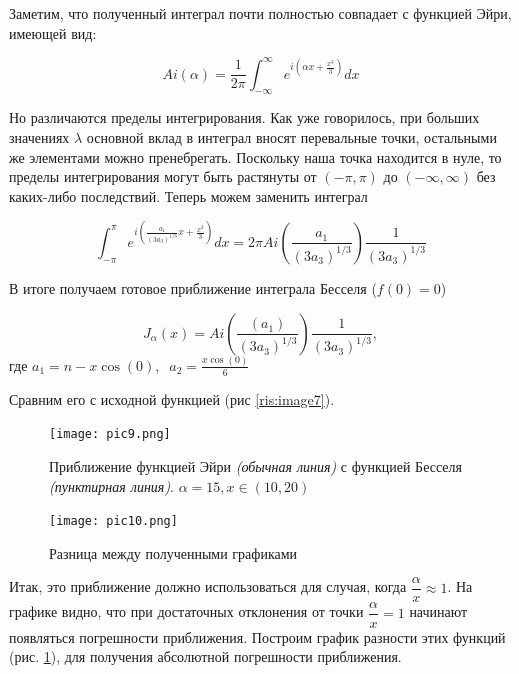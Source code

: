 \documentclass[14pt]{extarticle}
\begin{document}
Заметим, что полученный интеграл почти полностью совпадает с функцией Эйри, имеющей вид:

\begin{equation}\nonumber
Ai(\alpha) = \frac{1}{2\pi}\int_{-\infty}^{\infty}e^{i\left(\alpha x + \frac{x^3}{3}\right)}dx 
\end{equation}

Но различаются пределы интегрирования. Как уже говорилось, при больших значениях $\lambda$ основной вклад в интеграл вносят перевальные точки, остальными же элементами можно пренебрегать. Поскольку наша точка находится в нуле, то пределы интегрирования могут быть растянуты от $(-\pi, \pi)$ до $(-\infty, \infty)$ без каких-либо последствий. Теперь можем заменить интеграл 
  
\begin{equation}\nonumber
	\int_{-\pi}^{\pi}e^{i\left(\frac{a_1}{(3a_3)^{1/3}}x + \frac{x^3}{3}\right)}dx = 2\pi Ai\left(\frac{a_1}{(3 a_3)^{1/3}}\right) \frac{1}{(3 a_3)^{1/3}}
\end{equation}

В итоге получаем готовое приближение интеграла Бесселя ($f(0)=0$)

\begin{equation}\label{eq:eq19}
J_\alpha(x) = Ai\left(\frac{(a_1)}{(3 a_3)^{1/3}}\right) \frac{1}{(3 a_3)^{1/3}},
\end{equation}
где $a_1=n-x\cos(0), \;\; a_2=\frac{x\cos(0)}{6}$

Сравним его с исходной функцией (рис \ref{ris:image7}).

\begin{figure}[h]
\begin{center}
	\begin{minipage}[h]{0.45\linewidth}
		\texttt{[image: pic9.png]}
		\caption{Приближение функцией Эйри \textit{(обычная линия)} с функцией Бесселя \textit{(пунктирная линия)}. $\alpha=15, x \in (10, 20)$} %
		\label{ris:image7} %
	\end{minipage}
	\hfill 
	\begin{minipage}[h]{0.45\linewidth}
		\texttt{[image: pic10.png]}
		\caption{Разница между полученными графиками}
		\label{ris:image8}
	\end{minipage}
\end{center}
\end{figure}

Итак, это приближение должно использоваться для случая, когда $\dfrac{\alpha}{x} \approx 1$. На графике видно, что при достаточных отклонения от точки $\dfrac{\alpha}{x} =1$ начинают появляться погрешности приближения. Построим график разности этих функций (рис. \ref{ris:image8}), для получения абсолютной погрешности приближения.
\end{document}
